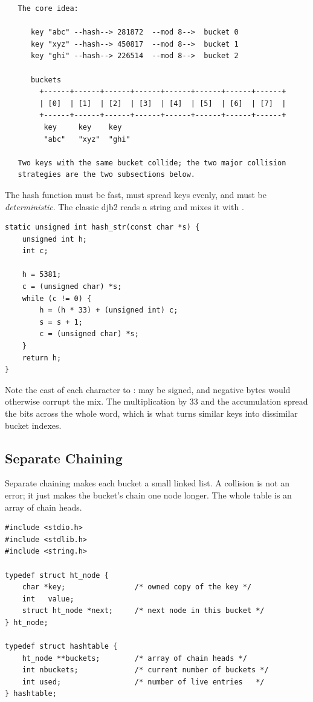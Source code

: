 \begin{verbatim}
   The core idea:

      key "abc" --hash--> 281872  --mod 8-->  bucket 0
      key "xyz" --hash--> 450817  --mod 8-->  bucket 1
      key "ghi" --hash--> 226514  --mod 8-->  bucket 2

      buckets
        +------+------+------+------+------+------+------+------+
        | [0]  | [1]  | [2]  | [3]  | [4]  | [5]  | [6]  | [7]  |
        +------+------+------+------+------+------+------+------+
         key     key    key
         "abc"   "xyz"  "ghi"

   Two keys with the same bucket collide; the two major collision
   strategies are the two subsections below.
\end{verbatim}

The hash function must be fast, must spread keys evenly, and must be
\emph{deterministic}. The classic djb2 reads a string and mixes it with
.

\begin{lstlisting}[caption={djb2: a simple, proven string hash.}]
static unsigned int hash_str(const char *s) {
    unsigned int h;
    int c;

    h = 5381;
    c = (unsigned char) *s;
    while (c != 0) {
        h = (h * 33) + (unsigned int) c;
        s = s + 1;
        c = (unsigned char) *s;
    }
    return h;
}
\end{lstlisting}

Note the cast of each character to : 
may be signed, and negative bytes would otherwise corrupt the mix.
The multiplication by 33 and the accumulation spread the bits across
the whole word, which is what turns similar keys into dissimilar
bucket indexes.

\subsection{Separate Chaining}

Separate chaining makes each bucket a small linked list. A collision is
not an error; it just makes the bucket's chain one node longer. The
whole table is an array of chain heads.

\begin{lstlisting}[caption={A chained hash table.}]
#include <stdio.h>
#include <stdlib.h>
#include <string.h>

typedef struct ht_node {
    char *key;                /* owned copy of the key */
    int   value;
    struct ht_node *next;     /* next node in this bucket */
} ht_node;

typedef struct hashtable {
    ht_node **buckets;        /* array of chain heads */
    int nbuckets;             /* current number of buckets */
    int used;                 /* number of live entries   */
} hashtable;
\end{lstlisting}

